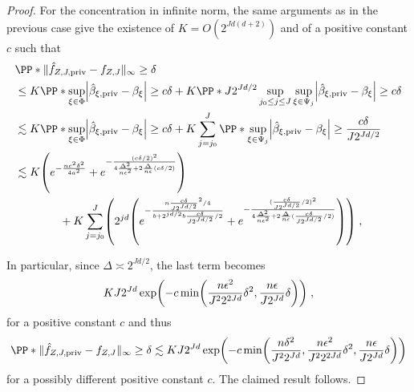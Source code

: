 \documentclass{article}
\newcommand{\1}{\mathds{1}}
\DeclarePairedDelimiter{\abs}{\lvert}{\rvert}
\DeclarePairedDelimiter{\paren}{\lparen}{\rparen}
\theoremstyle{plain}
\theoremstyle{definition}
\theoremstyle{remark}
\begin{document}
\begin{proof}
For the concentration in infinite norm, the same arguments as in the previous case give the existence of $K = O(2^{Jd(d+2)})$ and of a positive constant $c$ such that
\begin{equation}
    \begin{aligned}
        &\PP*{\| \hat{f}_{Z, J, \textrm{priv}} - f_{Z, J} \|_{\infty} \geq \delta} \\
        &\leq 
        K \PP*{\sup_{\xi \in \Phi} \abs*{\hat{\beta}_{\xi, \textrm{priv}} - {\beta}_{\xi}} \geq c \delta}
        + K \PP*{J 2^{Jd/2} \sup_{j_0\leq j \leq J}\sup_{\xi \in \Psi_j} \abs*{\hat{\beta}_{\xi, \textrm{priv}} - {\beta}_{\xi}} \geq  c\delta} \\
        &\lesssim 
        K \PP*{\sup_{\xi \in \Phi} \abs*{\hat{\beta}_{\xi, \textrm{priv}} - {\beta}_{\xi}} \geq c \delta}
        + K \sum_{j=j_0}^J 
        \PP*{\sup_{\xi \in \Psi_j} \abs*{\hat{\beta}_{\xi, \textrm{priv}} - {\beta}_{\xi}} \geq \frac{c\delta}{J2^{Jd/2}}} \\
        &\lesssim 
        K \paren*{e^{- \frac{n c^2 \delta^2}{4a^2}} + e^{-\frac{( c \delta/2)^2}{4\frac{\Delta^2}{n \epsilon^2} + 2\frac{\Delta}{n \epsilon} ( c\delta/2)}}} \\
        &\qquad\qquad+ K \sum_{j=j_0}^J  \paren*{2^{jd} \paren*{e^{- \frac{n \frac{c\delta}{J2^{Jd/2}}^2 / 4}{b+2^{jd/2} b \frac{c\delta}{J2^{Jd/2}}/2}} + e^{-\frac{(\frac{c\delta}{J2^{Jd/2}}/2)^2}{4\frac{\Delta^2}{n \epsilon^2} + 2\frac{\Delta}{n \epsilon} (\frac{c\delta}{J2^{Jd/2}}/2)}} }} \;,
    \end{aligned}
\end{equation}

In particular, since $\Delta \asymp 2^{Jd/2}$, the last term becomes
\begin{equation}
    K J2^{Jd}\exp\paren*{-c \min \paren*{\frac{n\epsilon^2}{J^2 2^{2Jd}}\delta^2, \frac{n\epsilon}{J2^{Jd}}\delta}} \;,
\end{equation}
for a positive constant $c$
and thus 
\begin{equation}
\label{eq:linfty-simple_2}
\PP*{\| \hat{f}_{Z, J, \textrm{priv}} - f_{Z, J} \|_{\infty} \geq \delta}
\lesssim
K J 2^{Jd} \exp \paren*{-c \min \paren*{\frac{n\delta^2}{J^2 2^{Jd}}, \frac{n\epsilon^2}{J^2 2^{2Jd}}\delta^2, \frac{n\epsilon}{J2^{Jd}}\delta}} 
\end{equation}
for a possibly different positive constant $c$.
The claimed result follows.
\end{proof}
\end{document}
